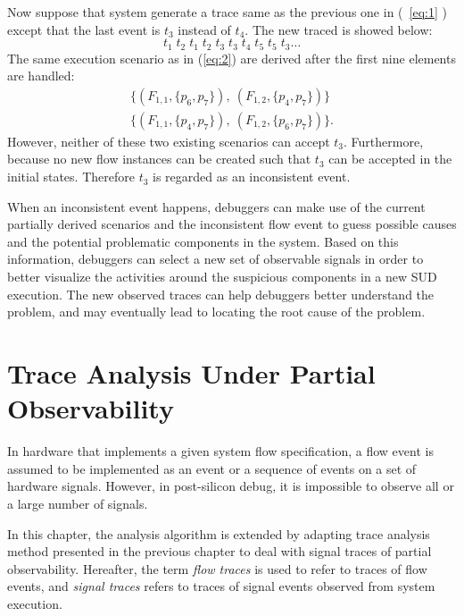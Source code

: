 \documentclass[12pt,frontmatter,copyright,thesis]{usfmanus}
\begin{document}
Now suppose that system generate a trace same as the previous one in (~\ref{eq:1} )
except that the last event is $t_3$ instead of $t_4$. The new traced is showed below:
\[
	t_1\;t_2\;t_1\;t_2\;t_3\;t_3\;t_4\;t_5\;t_5\;t_3\ldots
\]  
The same execution scenario as in (\ref{eq:2}) are derived after the first nine elements are handled:
\[
\begin{array}{l}
	\{(F_{1,1}, \{p_6, p_7\}),~(F_{1,2}, \{p_4, p_7\})\} \\
	\{(F_{1,1}, \{p_4, p_7\}),~(F_{1,2}, \{p_6, p_7\})\}.
\end{array}
\]
 However, neither of these two existing scenarios can accept
 $t_3$. Furthermore, because no new flow instances can
 be created such that $t_3$ can be accepted in the initial
 states. Therefore $t_3$ is regarded as an inconsistent event.
 
When an inconsistent event happens, debuggers can make use
of the current partially derived scenarios and the inconsistent flow event to
guess possible causes and the potential problematic 
components in the system.
Based on this information, debuggers can 
select a new set of observable signals in order to better visualize the activities around
the suspicious components in a new SUD execution.
The new observed traces can help
debuggers better understand the problem,
and may eventually lead to locating the
root cause of the problem.
  
\chapter{Trace Analysis Under Partial Observability}

In hardware that implements a given system flow
 specification, a flow event is assumed to be implemented as an event or a
 sequence of events on a set of hardware signals.  
 However, in post-silicon debug, 
 it is impossible to observe all or a
 large number of
 signals. 
 
 

 
 In this chapter, the analysis algorithm is extended by adapting
 trace analysis method presented in the previous chapter to deal
 with signal traces of partial observability. 
Hereafter, the term {\em flow traces} is used to refer to
traces of flow events, and {\em signal traces} refers to traces of signal events
observed from system execution.
\end{document}
